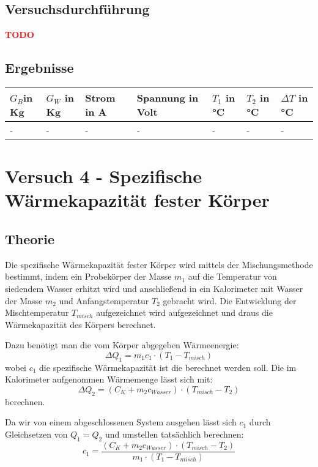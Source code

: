     \subsection{Versuchsdurchführung}

        		\textbf{\textcolor{red}{TODO}}
    \subsection{Ergebnisse}



        \begin{table}[H]
            \centering
            \begin{tabular}{|l|l|l|l|l|l|l|}
                \hline
                $G_{B}$in Kg & $G_{W}$ in Kg & Strom in A & Spannung in Volt  & $T_{1}$ in °C & $T_{2}$ in °C & $\Delta T$ in °C \\
                \hline
                -& - & - & - & - & - & - \\
                \hline
    
            \end{tabular}
        \end{table}

\section{Versuch 4 - Spezifische Wärmekapazität fester Körper}
	    \subsection{Theorie}
	Die spezifische Wärmekapazität fester Körper wird mittels der Mischungsmethode bestimmt, indem ein Probekörper der Masse $m_{1}$ auf die Temperatur von siedendem Wasser erhitzt wird und anschließend in ein Kalorimeter mit Wasser der Masse $m_{2}$ und Anfangstemperatur $T_{2}$ gebracht wird. Die Entwicklung der Mischtemperatur $T_{misch}$ aufgezeichnet wird aufgezeichnet und draus die Wärmekapazität des Körpers berechnet.
	
	Dazu benötigt man die vom Körper abgegeben Wärmeenergie:
	$$\Delta Q_{1} = m_{1}c_{1} \cdot (T_{1} - T_{misch})$$
	wobei $c_{1}$ die spezifische Wärmekapazität ist die berechnet werden soll. Die im Kalorimeter aufgenommen Wärmemenge lässt sich mit:
	$$\Delta Q_{2} = (C_{K} + m_{2}c_{Wasser}) \cdot (T_{misch} - T_{2})$$
	berechnen.
	
	Da wir von einem abgeschlossenen System ausgehen lässt sich $c_{1}$ durch Gleichsetzen von $Q_{1} = Q_{2}$ und umstellen tatsächlich berechnen:
	$$c_{1} = \frac{(C_{K} +m_{2}c_{Wasser}) \cdot (T_{misch} - T_{2})}{m_{1} \cdot (T_{1} - T_{misch})}$$
	
